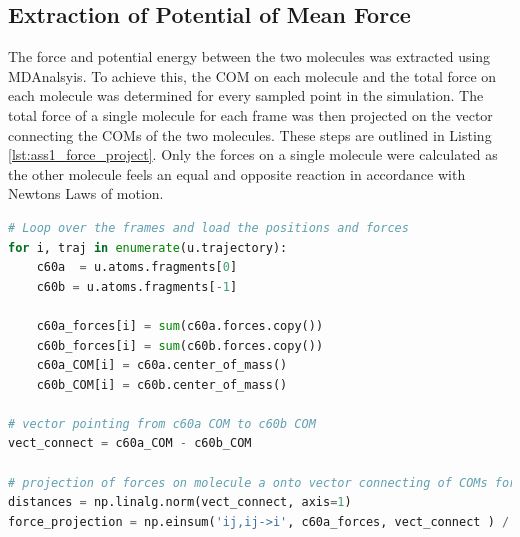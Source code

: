 \documentclass[10pt,a4paper]{labreport}
\begin{document}
\subsection{Extraction of Potential of Mean Force}
The force and potential energy between the two molecules was extracted using MDAnalsyis. To achieve this, the COM on each molecule and the total force on each molecule was determined for every sampled point in the simulation. The total force of a single molecule for each frame was then projected on the vector connecting the COMs of the two molecules. These steps are outlined in Listing \ref{lst:ass1_force_project}. Only the forces on a single molecule were calculated as the other molecule feels an equal and opposite reaction in accordance with Newtons Laws of motion. 
\begin{lstlisting}[language=Python,
                   label=lst:ass1_force_project,
                   caption={The python code used to extract the total force of a molecule projected onto the vector connecting the two COMs of the molecules. The molecules were identified using \texttt{u.atoms.fragments} to group atoms based on if they are reachable by transversing bonds.}
                  ]
# Loop over the frames and load the positions and forces
for i, traj in enumerate(u.trajectory):    
    c60a  = u.atoms.fragments[0]
    c60b = u.atoms.fragments[-1]

    c60a_forces[i] = sum(c60a.forces.copy())
    c60b_forces[i] = sum(c60b.forces.copy())
    c60a_COM[i] = c60a.center_of_mass()
    c60b_COM[i] = c60b.center_of_mass()

# vector pointing from c60a COM to c60b COM
vect_connect = c60a_COM - c60b_COM

# projection of forces on molecule a onto vector connecting of COMs for each distance
distances = np.linalg.norm(vect_connect, axis=1)
force_projection = np.einsum('ij,ij->i', c60a_forces, vect_connect ) / distances
  \end{lstlisting}
\end{document}
